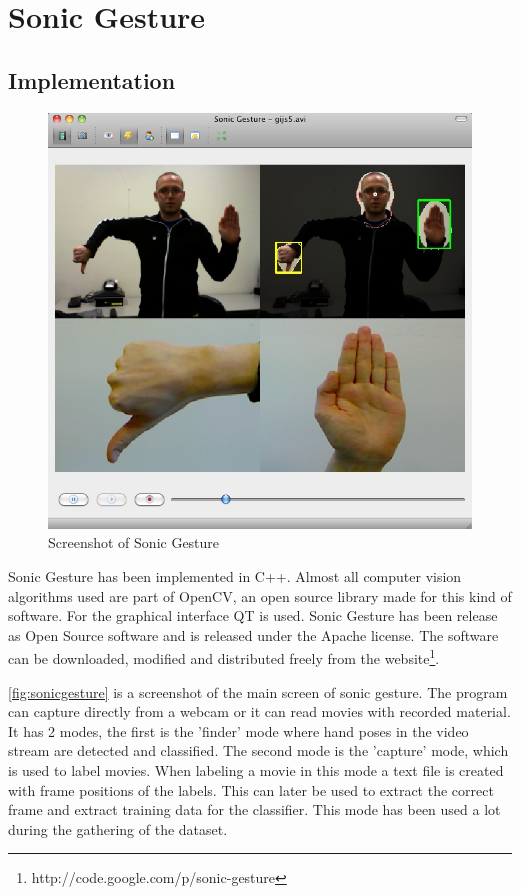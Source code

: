 
\chapter{Sonic Gesture}
\label{ch:sonicgesture}

\section{Implementation}
\label{sec:implementation}

\begin{figure}[ht]
\centering{}
\includegraphics[width=0.6\linewidth]{figures/sonicgesture.jpg}
\caption{Screenshot of Sonic Gesture}
\label{fig:sonicgesture}
\end{figure}

Sonic Gesture has been implemented in C++. Almost all computer vision algorithms used are part of OpenCV, an open source library made for this kind of software. For the graphical interface QT is used. Sonic Gesture has been release as Open Source software and is released under the Apache license. The software can be downloaded, modified and distributed freely from the website\footnote{http://code.google.com/p/sonic-gesture}.

\autoref{fig:sonicgesture} is a screenshot of the main screen of sonic gesture. The program can capture directly from a webcam or it can read movies with recorded material. It has 2 modes, the first is the 'finder' mode where hand poses in the video stream are detected and classified. The second mode is the 'capture' mode, which is used to label movies. When labeling a movie in this mode a text file is created with frame positions of the labels. This can later be used to extract the correct frame and extract training data for the classifier. This mode has been used a lot during the gathering of the dataset.

